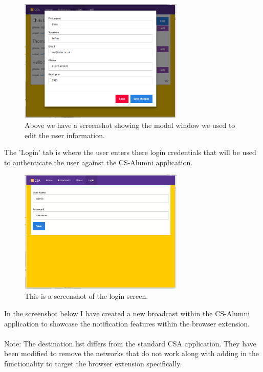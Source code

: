 \documentclass{article}
\begin{document}
\begin{figure}[H]
\centering
\includegraphics[width=0.7\textwidth]{modalpage}
\caption{Above we have a screenshot showing the modal window we used to edit the user information.}
\end{figure}

\newpage
The 'Login' tab is where the user enters there login credentials that will be used to authenticate the user against the CS-Alumni application.

\begin{figure}[H]
\centering
\includegraphics[width=0.7\textwidth]{loginpage}
\caption{This is a screenshot of the login screen.}
\end{figure}

In the screenshot below I have created a new broadcast within the CS-Alumni application to showcase the notification features within the browser extension.\\
\\
Note: The destination list differs from the standard CSA application. They have been modified to remove the networks that do not work along with adding in the functionality to target the browser extension specifically.\\
\end{document}
